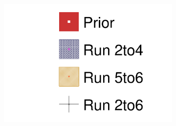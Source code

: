 \begin{figure}[h]
	\begin{subfigure}[t]{0.10\textwidth}
		\includegraphics[width=\textwidth, trim={0mm 0mm 0mm 0mm}, clip,page=1]{figures/mach3/data/alt/2017b_Run2to4_Data_merge_2017b_Run56_Data_merge_2017b_NewData_NewDet_UpdXsecStep_2Xsec_4Det_5Flux_0}
	\end{subfigure}
	

\end{figure}
